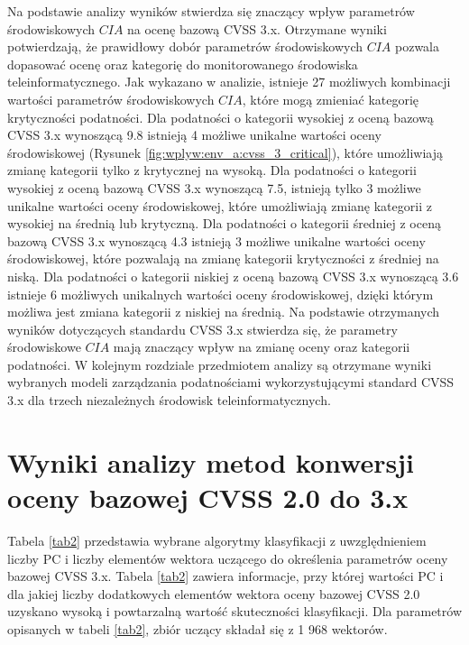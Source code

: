 \bigbreak
Na podstawie analizy wyników stwierdza się znaczący wpływ parametrów środowiskowych $CIA$ na ocenę bazową CVSS 3.x. Otrzymane wyniki potwierdzają, że prawidłowy dobór parametrów środowiskowych $CIA$ pozwala dopasować ocenę oraz kategorię do monitorowanego środowiska teleinformatycznego. Jak wykazano w analizie, istnieje 27 możliwych kombinacji wartości parametrów środowiskowych $CIA$, które mogą zmieniać kategorię krytyczności podatności. Dla podatności o kategorii wysokiej z oceną bazową CVSS 3.x wynoszącą 9.8 istnieją 4 możliwe unikalne wartości oceny środowiskowej (Rysunek \ref{fig:wplyw:env_a:cvss_3_critical}), które umożliwiają zmianę kategorii tylko z krytycznej na wysoką. Dla podatności o kategorii wysokiej z oceną bazową CVSS 3.x wynoszącą 7.5, istnieją tylko 3 możliwe unikalne wartości oceny środowiskowej, które umożliwiają zmianę kategorii z wysokiej na średnią lub krytyczną. Dla podatności o kategorii średniej z oceną bazową CVSS 3.x wynoszącą 4.3 istnieją 3 możliwe unikalne wartości oceny środowiskowej, które pozwalają na zmianę kategorii krytyczności z średniej na niską. Dla podatności o kategorii niskiej z oceną bazową CVSS 3.x wynoszącą 3.6 istnieje 6 możliwych unikalnych wartości oceny środowiskowej, dzięki którym możliwa jest zmiana kategorii z niskiej na średnią. Na podstawie otrzymanych wyników dotyczących standardu CVSS 3.x stwierdza się, że parametry środowiskowe $CIA$ mają znaczący wpływ na zmianę oceny oraz kategorii podatności. W kolejnym rozdziale przedmiotem analizy są otrzymane wyniki wybranych modeli zarządzania podatnościami wykorzystującymi standard CVSS 3.x dla trzech niezależnych środowisk teleinformatycznych.


\section{Wyniki analizy metod konwersji oceny bazowej CVSS 2.0 do 3.x}
\label{sec:ml_analiza}

Tabela \ref{tab2} przedstawia wybrane algorytmy klasyfikacji z uwzględnieniem liczby PC i liczby elementów wektora uczącego do określenia parametrów oceny bazowej CVSS 3.x.
Tabela \ref{tab2} zawiera informacje, przy której wartości PC  i dla jakiej liczby dodatkowych elementów wektora oceny bazowej CVSS 2.0 uzyskano wysoką i powtarzalną wartość skuteczności klasyfikacji. Dla parametrów opisanych w tabeli \ref{tab2}, zbiór uczący składał się z 1 968 wektorów.



